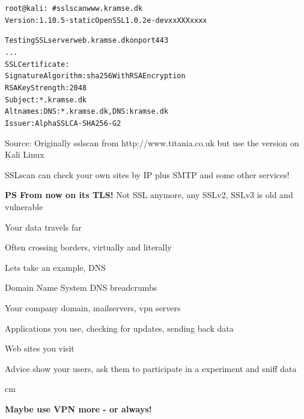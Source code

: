 \documentclass[Screen16to9,17pt]{foils}
\begin{document}

\begin{alltt}\small
root@kali:~# sslscan www.kramse.dk
Version: 1.10.5-static OpenSSL 1.0.2e-dev xx XXX xxxx

Testing SSL server web.kramse.dk on port 443
...
  SSL Certificate:
Signature Algorithm: sha256WithRSAEncryption
RSA Key Strength:    2048
Subject:  *.kramse.dk
Altnames: DNS:*.kramse.dk, DNS:kramse.dk
Issuer:   AlphaSSL CA - SHA256 - G2
\end{alltt}

Source:
Originally sslscan from http://www.titania.co.uk
 but use the version on Kali Linux

SSLscan can check your own sites by IP plus SMTP and some other services!

{\bf
PS From now on its TLS!} Not SSL anymore, any SSLv2, SSLv3 is old and vulnerable





\begin{list2}
\item Your data travels far
\item Often crossing borders, virtually and literally
\end{list2}


\begin{list1}
\item Lets take an example, DNS
\item Domain Name System DNS breadcrumbs
\begin{list2}
\item Your company domain, mailservers, vpn servers
\item Applications you use, checking for updates, sending back data
\item Web sites you visit
\end{list2}
\vskip 1cm
\item Advice show your users, ask them to participate in a experiment and sniff data
\end{list1}


 cm
\centerline{\bf\Large Maybe use VPN more - or always!}

\end{document}
